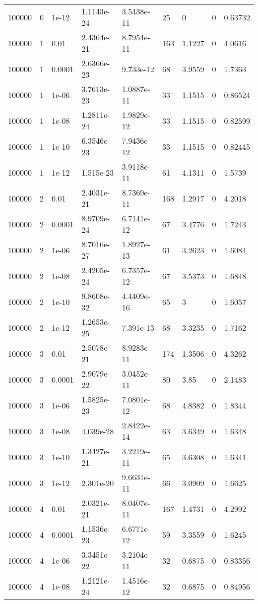 \begin{tabular}{lllllllll}
100000 & 0 & 1e-12 & 1.1143e-24 & 3.5438e-11 & 25 & 0 & 0 & 0.63732 \\ 
100000 & 1 & 0.01 & 2.4364e-21 & 8.7954e-11 & 163 & 1.1227 & 0 & 4.0616 \\ 
100000 & 1 & 0.0001 & 2.6366e-23 & 9.733e-12 & 68 & 3.9559 & 0 & 1.7363 \\ 
100000 & 1 & 1e-06 & 3.7613e-23 & 1.0887e-11 & 33 & 1.1515 & 0 & 0.86524 \\ 
100000 & 1 & 1e-08 & 1.2811e-24 & 1.9829e-12 & 33 & 1.1515 & 0 & 0.82599 \\ 
100000 & 1 & 1e-10 & 6.3546e-23 & 7.9436e-12 & 33 & 1.1515 & 0 & 0.82445 \\ 
100000 & 1 & 1e-12 & 1.515e-23 & 3.9118e-11 & 61 & 4.1311 & 0 & 1.5739 \\ 
100000 & 2 & 0.01 & 2.4031e-21 & 8.7369e-11 & 168 & 1.2917 & 0 & 4.2018 \\ 
100000 & 2 & 0.0001 & 8.9709e-24 & 6.7141e-12 & 67 & 3.4776 & 0 & 1.7243 \\ 
100000 & 2 & 1e-06 & 8.7016e-27 & 1.8927e-13 & 61 & 3.2623 & 0 & 1.6084 \\ 
100000 & 2 & 1e-08 & 2.4205e-24 & 6.7357e-12 & 67 & 3.5373 & 0 & 1.6848 \\ 
100000 & 2 & 1e-10 & 9.8608e-32 & 4.4409e-16 & 65 & 3 & 0 & 1.6057 \\ 
100000 & 2 & 1e-12 & 1.2653e-25 & 7.391e-13 & 68 & 3.3235 & 0 & 1.7162 \\ 
100000 & 3 & 0.01 & 2.5078e-21 & 8.9283e-11 & 174 & 1.3506 & 0 & 4.3262 \\ 
100000 & 3 & 0.0001 & 2.9079e-22 & 3.0452e-11 & 80 & 3.85 & 0 & 2.1483 \\ 
100000 & 3 & 1e-06 & 1.5825e-23 & 7.0801e-12 & 68 & 4.8382 & 0 & 1.8344 \\ 
100000 & 3 & 1e-08 & 4.039e-28 & 2.8422e-14 & 63 & 3.6349 & 0 & 1.6348 \\ 
100000 & 3 & 1e-10 & 1.3427e-21 & 3.2219e-11 & 65 & 3.6308 & 0 & 1.6341 \\ 
100000 & 3 & 1e-12 & 2.301e-20 & 9.6631e-11 & 66 & 3.0909 & 0 & 1.6625 \\ 
100000 & 4 & 0.01 & 2.0321e-21 & 8.0407e-11 & 167 & 1.4731 & 0 & 4.2992 \\ 
100000 & 4 & 0.0001 & 1.1536e-23 & 6.6771e-12 & 59 & 3.3559 & 0 & 1.6245 \\ 
100000 & 4 & 1e-06 & 3.3451e-22 & 3.2104e-11 & 32 & 0.6875 & 0 & 0.83356 \\ 
100000 & 4 & 1e-08 & 1.2121e-24 & 1.4516e-12 & 32 & 0.6875 & 0 & 0.84956 \\ 

\end{tabular}
